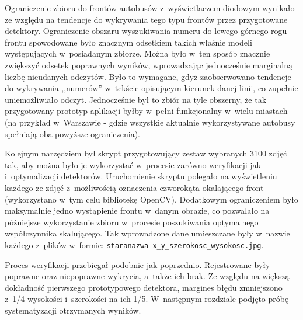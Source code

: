 Ograniczenie zbioru do frontów autobusów z~wyświetlaczem diodowym
wynikało ze względu na tendencje do wykrywania 
tego typu frontów przez przygotowane detektory. Ograniczenie
obszaru wyszukiwania numeru do lewego górnego rogu frontu
spowodowane było znacznym odsetkiem takich właśnie modeli 
występujących w~posiadanym zbiorze. Można było 
w~ten sposób znacznie zwiększyć odsetek poprawnych wyników,
wprowadzając jednocześnie marginalną liczbę nieudanych odczytów.
Było to wymagane, gdyż zaobserwowano tendencje do 
wykrywania ,,numerów'' w~tekście opisującym 
kierunek danej linii, co zupełnie uniemożliwiało odczyt.
Jednocześnie
był to zbiór na tyle obszerny, że tak przygotowany prototyp aplikacji byłby
w~pełni funkcjonalny w~wielu miastach (na przykład w~Warszawie - gdzie
wszystkie aktualnie wykorzystywane autobusy spełniają oba powyższe
ograniczenia).

Kolejnym narzędziem był skrypt przygotowujący zestaw wybranych 3100 zdjęć
tak, aby można było je wykorzystać w~procesie zarówno weryfikacji jak 
i~optymalizacji detektorów. Uruchomienie skryptu polegało na wyświetleniu
każdego ze zdjęć z~możliwością oznaczenia czworokąta okalającego front
(wykorzystano w~tym celu bibliotekę OpenCV). Dodatkowym ograniczeniem
było maksymalnie jedno wystąpienie frontu w~danym obrazie, co 
pozwalało na późniejsze wykorzystanie zbioru w~procesie
poszukiwania optymalnego współczynnika skalującego. Tak wprowadzone
dane umieszczane były w~nazwie każdego z~plików w~formie:
\verb|staranazwa-x_y_szerokosc_wysokosc.jpg|.

Proces weryfikacji przebiegał podobnie jak poprzednio. Rejestrowane były
poprawne oraz niepoprawne wykrycia, a~także ich brak. Ze względu na
większą dokładność pierwszego prototypowego detektora, margines
błędu zmniejszono z~1/4 wysokości i~szerokości na ich 1/5.
W~następnym rozdziale podjęto próbę systematyzacji otrzymanych wyników.
